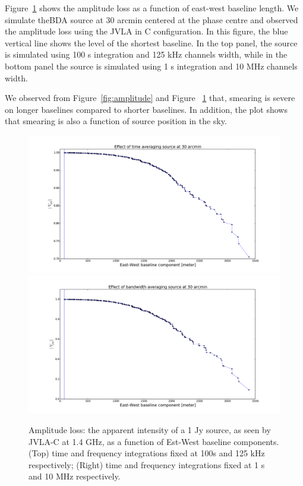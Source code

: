 \documentclass[useAMS,usenatbib]{mn2e}
\begin{document}
Figure~\ref{fig:srcat30arcmin_avg} shows the amplitude loss as  a function of east-west baseline length. We simulate theBDA source at 
30 arcmin centered at the phase centre and observed the amplitude loss using the JVLA in C configuration.
In this figure, the blue vertical line shows the level of the shortest baseline. In the top panel, the source is
simulated using 100 s integration and 125 kHz channels width, while in the bottom panel the source is simulated using 1 s integration
and 10 MHz channels width.

We observed from  Figure~\ref{fig:amplitude} and Figure ~\ref{fig:srcat30arcmin_avg} that, smearing is severe on  
longer baselines compared to shorter baselines. In addition, the plot 
shows that smearing is also a function of source position in the sky. 

\begin{figure}
\includegraphics[width=\columnwidth]{./Figures/effect_time_averaging_amplitude_src30arcmin.pdf}%
\includegraphics[width=\columnwidth]{./Figures/effect_bandwidth_averaging_amplitude_src30arcmin.pdf}
\caption{Amplitude loss: the apparent intensity of a 1 Jy source, as seen by JVLA-C at 1.4 GHz, 
as a function of Est-West baseline components. (Top) time and frequency integrations fixed at  100s and 125 kHz respectively; 
(Right) time and frequency integrations fixed at  1 s and 10 MHz respectively.}\label{fig:srcat30arcmin_avg}
\end{figure}
\end{document}

